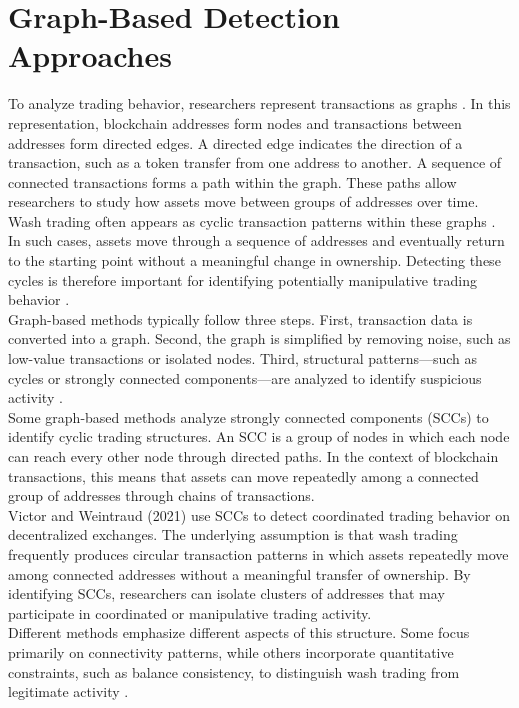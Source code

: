 \documentclass[language=english,thesis=bachelor,nosecondtitle,faculty=cb,onesided,13pt]{hsmw-thesis}
\begin{document}
	\section{Graph-Based Detection Approaches}
To analyze trading behavior, researchers represent transactions as graphs \cite{chen2020traveling, somin2018network}. In this representation, blockchain addresses form nodes and transactions between addresses form directed edges. A directed edge indicates the direction of a transaction, such as a token transfer from one address to another. A sequence of connected transactions forms a path within the graph. These paths allow researchers to study how assets move between groups of addresses over time.\\
Wash trading often appears as cyclic transaction patterns within these graphs \cite{imisiker2018wash, cao2016detecting, victor2021detecting, cui2023chain}. In such cases, assets move through a sequence of addresses and eventually return to the starting point without a meaningful change in ownership. Detecting these cycles is therefore important for identifying potentially manipulative trading behavior \cite{cui2023chain}.\\
Graph-based methods typically follow three steps. First, transaction data is converted into a graph. Second, the graph is simplified by removing noise, such as low-value transactions or isolated nodes. Third, structural patterns—such as cycles or strongly connected components—are analyzed to identify suspicious activity \cite{victor2021detecting}.\\
Some graph-based methods analyze strongly connected components (SCCs) to identify cyclic trading structures. An SCC is a group of nodes in which each node can reach every other node through directed paths. In the context of blockchain transactions, this means that assets can move repeatedly among a connected group of addresses through chains of transactions.\\
Victor and Weintraud (2021) use SCCs to detect coordinated trading behavior on decentralized exchanges. The underlying assumption is that wash trading frequently produces circular transaction patterns in which assets repeatedly move among connected addresses without a meaningful transfer of ownership. By identifying SCCs, researchers can isolate clusters of addresses that may participate in coordinated or manipulative trading activity.\\
Different methods emphasize different aspects of this structure. Some focus primarily on connectivity patterns, while others incorporate quantitative constraints, such as balance consistency, to distinguish wash trading from legitimate activity \cite{cui2023chain}.
\end{document}
